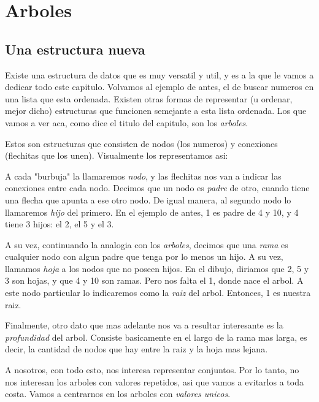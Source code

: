 \documentclass{article}
\begin{document}
\newpage
\section{Arboles}

\subsection{Una estructura nueva}

Existe una estructura de datos que es muy versatil y util, y es a la que le vamos a dedicar todo este capitulo. Volvamos al ejemplo de antes, el de buscar numeros en una lista que esta ordenada. Existen otras formas de representar (u ordenar, mejor dicho) estructuras que funcionen semejante a esta lista ordenada. Los que vamos a ver aca, como dice el titulo del capitulo, son los \textit{arboles}.

Estos son estructuras que consisten de nodos (los numeros) y conexiones (flechitas que los unen). Visualmente los representamos asi:

\begin{multicols}{2}

	A cada "burbuja" la llamaremos \textit{nodo}, y las flechitas nos van a indicar las conexiones entre cada nodo. Decimos que un nodo es \textit{padre} de otro, cuando tiene una flecha que apunta a ese otro nodo. De igual manera, al segundo nodo lo llamaremos \textit{hijo} del primero. En el ejemplo de antes, 1 es padre de 4 y 10, y 4 tiene 3 hijos: el 2, el 5 y el 3.
\end{multicols}

A su vez, continuando la analogia con los \textit{arboles}, decimos que una \textit{rama} es cualquier nodo con algun padre que tenga por lo menos un hijo. A su vez, llamamos \textit{hoja} a los nodos que no poseen hijos. En el dibujo, diriamos que 2, 5 y 3 son hojas, y que 4 y 10 son ramas. Pero nos falta el 1, donde nace el arbol. A este nodo particular lo indicaremos como la \textit{raiz} del arbol. Entonces, 1 es nuestra raiz.

Finalmente, otro dato que mas adelante nos va a resultar interesante es la \textit{profundidad} del arbol. Consiste basicamente en el largo de la rama mas larga, es decir, la cantidad de nodos que hay entre la raiz y la hoja mas lejana.

A nosotros, con todo esto, nos interesa representar conjuntos. Por lo tanto, no nos interesan los arboles con valores repetidos, asi que vamos a evitarlos a toda costa. Vamos a centrarnos en los arboles con \textit{valores unicos}.
\end{document}
